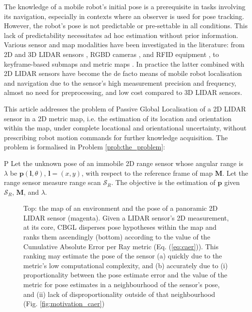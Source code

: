 The knowledge of a mobile robot's initial pose is a prerequisite in tasks
involving its navigation, especially in contexts where an observer is used for
pose tracking. However, the robot's pose is not predictable or pre-settable in
all conditions. This lack of predictability necessitates ad hoc estimation
without prior information. Various sensor and map modalities have been
investigated in the literature: from 2D and 3D LIDAR sensors
\cite{als_eth,Cop2018a}, RGBD cameras \cite{Guo2016}, and RFID equipment
\cite{Tzitzis2023b}, to keyframe-based submaps \cite{Lowry2016} and metric maps
\cite{Rosen2021}. In practice the latter combined with 2D LIDAR sensors have
become the de facto means of mobile robot localisation and navigation due to
the sensor's high measurement precision and frequency, almost no need for
preprocessing, and low cost compared to 3D LIDAR sensors.

This article addresses the problem of Passive Global Localisation of a 2D LIDAR
sensor in a 2D metric map, i.e. the estimation of its location and orientation
within the map, under complete locational and orientational uncertainty,
without prescribing robot motion commands
for further knowledge acquisition. The problem is
formalised in Problem \ref{prob:the_problem}:

\begin{customprb}{P}
  \label{prob:the_problem}
  Let the unknown pose of an immobile 2D range sensor whose angular range is
  $\lambda$ be $\bm{p}(\bm{l},\theta)$, $\bm{l} = (x,y)$, with respect to the
  reference frame of map $\bm{M}$. Let the range sensor measure range scan
  $\mathcal{S}_R$. The objective is the estimation of $\bm{p}$ given
  $\mathcal{S}_R$, $\bm{M}$, and $\lambda$.
\end{customprb}

\begin{figure}\vspace{0.4em}
  
  \vspace{-1.75cm}
  \caption{\small Top: the map of an environment and the pose of a panoramic 2D
           LIDAR sensor (magenta). Given a LIDAR sensor's 2D measurement, at its
           core, CBGL disperses pose hypotheses within the map and ranks them
           ascendingly (bottom) according to the value of the Cumulative
           Absolute Error per Ray metric (Eq. (\ref{eq:caer})). This
           ranking may estimate the pose of the sensor (a) quickly due to the
           metric's low computational complexity, and (b) accurately due to (i)
           proportionality between the pose estimate error and the value of the
           metric for pose estimates in a neighbourhood of the sensor's pose,
           and (ii) lack of disproportionality outside of that neighbourhood
           (Fig. \ref{fig:motivation_caer})
           }
  \label{fig:face}
\end{figure}

